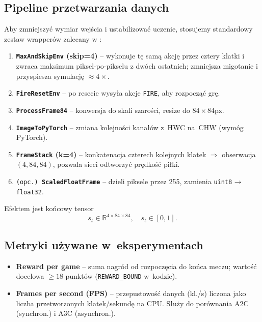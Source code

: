 \documentclass[12pt,a4paper]{article}
\begin{document}
\subsection{Pipeline przetwarzania danych}

Aby zmniejszyć wymiar wejścia i ustabilizować uczenie, stosujemy
standardowy zestaw wrapperów zalecany w \cite{Mnih2016A3C,Lapan2018}:

\begin{enumerate}
  \item \textbf{\texttt{MaxAndSkipEnv} (skip=4)}  
        – wykonuje tę samą akcję przez cztery klatki i zwraca maksimum
        piksel-po-pikselu z dwóch ostatnich; zmniejsza migotanie i 
        przyspiesza symulację \(\approx 4\times\).
  \item \textbf{\texttt{FireResetEnv}}  
        – po resecie wysyła akcje \texttt{FIRE}, aby rozpocząć grę.
  \item \textbf{\texttt{ProcessFrame84}}  
        – konwersja do skali szarości, resize do \(84\times84\)px.
  \item \textbf{\texttt{ImageToPyTorch}}  
        – zmiana kolejności kanałów z~HWC na~CHW (wymóg PyTorch).
  \item \textbf{\texttt{FrameStack} (k=4)}  
        – konkatenacja czterech kolejnych klatek
        \(\Rightarrow\) obserwacja \((4,84,84)\), pozwala
        sieci odtworzyć prędkość piłki.
  \item \texttt{(opc.) \textbf{ScaledFloatFrame}}  
        – dzieli piksele przez 255, zamienia \texttt{uint8} → \texttt{float32}.
\end{enumerate}

Efektem jest końcowy tensor
\begin{equation}
  s_t \in \mathbb{R}^{4\times84\times84},\quad s_t\in[0,1].
\end{equation}

\subsection{Metryki używane w~eksperymentach}

\begin{itemize}
  \item \textbf{Reward per game} –
        suma nagród od rozpoczęcia do końca meczu;
        wartość docelowa \(\ge 18\) punktów
        (\texttt{REWARD\_BOUND} w~kodzie).
  \item \textbf{Frames per second (FPS)} –
        przepustowość danych (kl./s) liczona jako
        liczba przetworzonych klatek/sekundę na CPU.
        Służy do porównania A2C (synchron.) i A3C (asynchron.).
\end{itemize}
\end{document}
